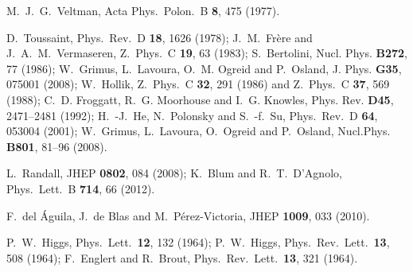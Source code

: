   M.~J.~G.~Veltman,
  Acta Phys.\ Polon.\ B {\bf 8}, 475 (1977).
  
  D.~Toussaint,
  Phys.\ Rev.\ D {\bf 18}, 1626 (1978);
  J.~M.~Fr\`ere and J.~A.~M.~Vermaseren,
  Z.\ Phys.\ C {\bf 19}, 63 (1983);
  S.~Bertolini,
  Nucl. Phys. \textbf{ B272}, 77 (1986);
  W.~Grimus, L.~Lavoura, O.~M. Ogreid and P.~Osland,
  J. Phys. \textbf{ G35}, 075001 (2008);
  W.~Hollik,
  Z.\ Phys.\ C {\bf 32}, 291 (1986) 
  and
  Z.\ Phys.\ C {\bf 37}, 569 (1988);
  C.~D. Froggatt, R.~G. Moorhouse and I.~G. Knowles,
  Phys. Rev. \textbf{ D45}, 2471--2481 (1992);
  H.~-J.~He, N.~Polonsky and S.~-f.~Su,
  Phys.\ Rev.\ D {\bf 64}, 053004 (2001);
  W.~Grimus, L.~Lavoura, O.~Ogreid and P.~Osland,
  Nucl.Phys. \textbf{ B801}, 81--96 (2008).

  L.~Randall,
  JHEP {\bf 0802}, 084 (2008);
  K.~Blum and R.~T.~D'Agnolo,
  Phys.\ Lett.\ B {\bf 714}, 66 (2012).
  
  F.~del \'Aguila, J.~de Blas and M.~P\'erez-Victoria,
  JHEP {\bf 1009}, 033 (2010).





  P.~W.~Higgs,
  Phys.\ Lett.\  {\bf 12}, 132 (1964);
  P.~W.~Higgs,
  Phys.\ Rev.\ Lett.\  {\bf 13}, 508 (1964);
  F.~Englert and R.~Brout,
  Phys.\ Rev.\ Lett.\  {\bf 13}, 321 (1964).
  
